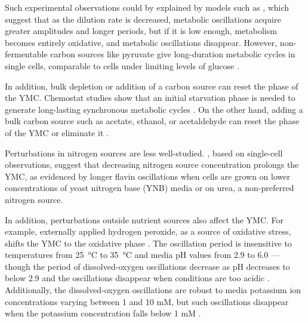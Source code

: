 Such experimental observations could by explained by models such as \textcite{jonesCyberneticModelGrowth1999}, which suggest that as the dilution rate is decreased, metabolic oscillations acquire greater amplitudes and longer periods, but if it is low enough, metabolism becomes entirely oxidative, and metabolic oscillations disappear.
However, non-fermentable carbon sources like pyruvate give long-duration metabolic cycles in single cells, comparable to cells under limiting levels of glucose \parencite{papagiannakisAutonomousMetabolicOscillations2017}.

In addition, bulk depletion or addition of a carbon source can reset the phase of the YMC.
Chemostat studies show that an initial starvation phase is needed to generate long-lasting synchronous metabolic cycles \parencite{tuLogicYeastMetabolic2005}. %
On the other hand, adding a bulk carbon source such as acetate, ethanol, or acetaldehyde can reset the phase of the YMC \citep{kuangMsn2RegulateExpression2017, krishnaMinimalPushPull2018} or eliminate it \citep{jonesCyberneticModelGrowth1999}.

Perturbations in nitrogen sources are less well-studied.
\textcite{baumgartnerFlavinbasedMetabolicCycles2018}, based on single-cell observations, suggest that decreasing nitrogen source concentration prolongs the YMC, as evidenced by longer flavin oscillations when cells are grown on lower concentrations of yeast nitrogen base (YNB) media or on urea, a non-preferred nitrogen source.

In addition, perturbations outside nutrient sources also affect the YMC.
For example, externally applied hydrogen peroxide, as a source of oxidative stress, shifts the YMC to the oxidative phase \citep{amponsahPeroxiredoxinsCoupleMetabolism2021}.
The oscillation period is insensitive to temperatures from \SI{25}{\celsius} to \SI{35}{\celsius} and media pH values from
2.9 to 6.0 \citep{lloydUltradianMetronomeTimekeeper2005} --- though the period of dissolved-oxygen oscillations decrease as pH decreases to below 2.9 and the oscillations disappear when conditions are too acidic \citep{oneillEukaryoticCellBiology2020}.
Additionally, the dissolved-oxygen oscillations are robust to media potassium ion concentrations varying between 1 and 10 mM, but such oscillations disappear when the potassium concentration falls below 1 mM \citep{oneillEukaryoticCellBiology2020}.

